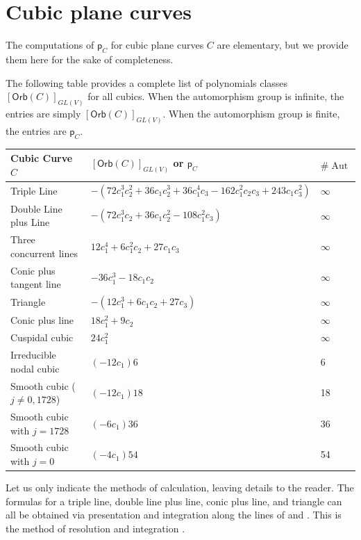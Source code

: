 \documentclass[12 pt, reqno]{amsart}
\theoremstyle{definition}
\newcommand{\on}{\operatorname}
\newcommand{\Orb}{\mathsf{Orb}}
\newcommand{\p}{\mathsf{p}}
\begin{document}
\section{Cubic plane curves}
\label{sec:cubicplanecurves}

The computations of $\p_C$ for cubic plane curves $C$ are elementary,
but we provide them here for the sake of completeness.


The following table provides a complete list of polynomials classes
$[\Orb(C)]_{GL(V)}$ for all cubics.  When the automorphism group is
infinite, the entries are simply $[\Orb(C)]_{GL(V)}$.  When the
automorphism group is finite, the entries are $\p_{C}$.
\begin{center}
\begin{longtable}{l | p{8cm}|p{2cm}}
  Cubic Curve $C$ & $[\Orb(C)]_{GL(V)}$ or $\p_{C}$ &$\#\on{Aut}$\\\hline
  Triple Line & $-(72 c_1^3 c_2^2+36 c_1 c_2^3+36 c_1^4 c_3-162 c_1^2 c_2 c_3+243 c_1 c_3^2)$ & $\infty$\\
  Double Line plus Line &
                          $-(72 c_1^3 c_2 + 36 c_1 c_2^2 - 108 c_1^2 c_3)$& $\infty$\\
  Three concurrent lines &
                           $12 c_1^4 + 6 c_1^2 c_2 + 27 c_1 c_3$& $\infty$\\
  Conic plus tangent line & 
                            $ -36 c_1^3 - 18 c_1 c_2$& $\infty$ \\
  Triangle & 
             $-(12 c_1^3 + 6 c_1 c_2 + 27 c_3)$& $\infty$ \\
  Conic plus line & 
                    $18 c_1^2 + 9 c_2$& $\infty$ \\
  Cuspidal cubic & 
                   $24 c_1^2$& $\infty$ \\
  Irreducible nodal cubic & 
                            $(-12c_1)6$& 6\\ 
  Smooth cubic ($j \neq 0, 1728$) &
                                    $(-12c_1)18$&18 \\
  Smooth cubic with $j = 1728$ &
                                 $(-6c_1)36$&36\\
  Smooth cubic with $j = 0$ &
                              $(-4c_1)54$&54
\end{longtable}
\end{center}

Let us only indicate the methods of calculation, leaving details to
the reader.  The formulas for a triple line, double line plus line,
conic plus line, and triangle can all be obtained via presentation and
integration along the lines of \cite[Theorem 3.1]{FNR06} and
. This is the method of resolution and integration
\cite[Section 3]{FR06}.
\end{document}
